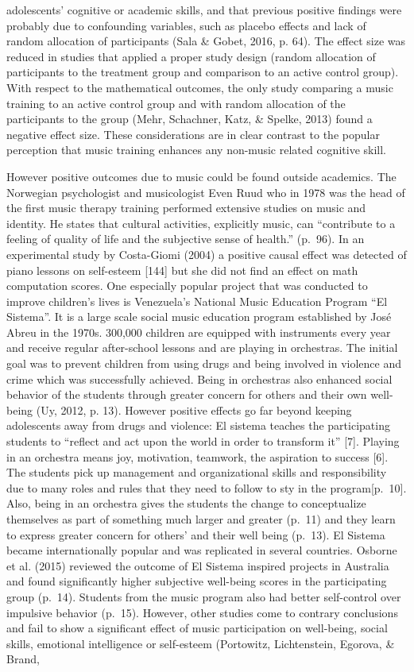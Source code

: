 \documentclass[a4, 12pt]{article}
\begin{document}
adolescents' cognitive or academic skills, and that previous positive findings were probably due to confounding variables, such as placebo effects and lack of random allocation of participants (Sala \& Gobet, 2016, p. 64). The effect size was reduced in studies that applied a proper study design (random allocation of participants to the treatment group and comparison to an active control group). With respect to the mathematical outcomes, the only study comparing a music training to an active control group and with random allocation of the participants to the group (Mehr, Schachner, Katz, \& Spelke, 2013) found a negative effect size. These considerations are in clear contrast to the popular perception that music training enhances any non-music related cognitive skill.

However positive outcomes due to music could be found outside academics. The Norwegian psychologist and musicologist Even Ruud who in 1978 was the head of the first music therapy training performed extensive studies on music and identity. He states that cultural activities, explicitly music, can ``contribute to a feeling of quality of life and the subjective sense of health.'' (p.~96). In an experimental study by Costa-Giomi (2004) a positive causal effect was detected of piano lessons on self-esteem {[}144{]} but she did not find an effect on math computation scores. One especially popular project that was conducted to improve children's lives is Venezuela's National Music Education Program ``El Sistema''. It is a large scale social music education program established by José Abreu in the 1970s. 300,000 children are equipped with instruments every year and receive regular after-school lessons and are playing in orchestras. The initial goal was to prevent children from using drugs and being involved in violence and crime which was successfully achieved. Being in orchestras also enhanced social behavior of the students through greater concern for others and their own well-being (Uy, 2012, p. 13). However positive effects go far beyond keeping adolescents away from drugs and violence: El sistema teaches the participating students to ``reflect and act upon the world in order to transform it'' {[}7{]}. Playing in an orchestra means joy, motivation, teamwork, the aspiration to success {[}6{]}. The students pick up management and organizational skills and responsibility due to many roles and rules that they need to follow to sty in the program{[}p.~10{]}. Also, being in an orchestra gives the students the change to conceptualize themselves as part of something much larger and greater (p.~11) and they learn to express greater concern for others' and their well being (p.~13). El Sistema became internationally popular and was replicated in several countries. Osborne et al. (2015) reviewed the outcome of El Sistema inspired projects in Australia and found significantly higher subjective well-being scores in the participating group (p.~14). Students from the music program also had better self-control over impulsive behavior (p.~15). However, other studies come to contrary conclusions and fail to show a significant effect of music participation on well-being, social skills, emotional intelligence or self-esteem (Portowitz, Lichtenstein, Egorova, \& Brand, 
\end{document}
